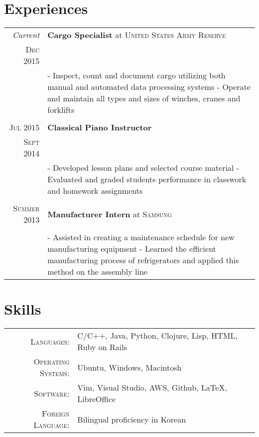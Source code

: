 \documentclass[a4paper,11pt]{article}
\begin{document}
			    \section{Experiences}
			    \begin{tabular}{r|p{11cm}}
			     \emph{Current} & \textbf{Cargo Specialist} at \textsc{United States Army Reserve} \\\textsc{Dec 2015}& \fontsize{10}{12}\selectfont{Arden Hills, MN}\\&\footnotesize{- Inspect, count and document cargo utilizing both manual and automated data processing systems \newline - Operate and maintain all types and sizes of winches, cranes and forklifts
			      }\\\multicolumn{2}{c}{} \\
			       \textsc{Jul 2015} & \textbf{Classical Piano Instructor} \\\textsc{Sept 2014} &\fontsize{10}{12}\selectfont{Oshkosh, WI} \\&\footnotesize{- Developed lesson plans and selected course material \newline- Evaluated and graded students performance in classwork and homework assignments} \\\multicolumn{2}{c}{} \\
			       \textsc{Summer 2013} & \textbf{Manufacturer Intern} at \textsc{Samsung}\\\textsc{} & \fontsize{10}{12}\selectfont{Gwangju, South Korea} \\&\footnotesize{- Assisted in creating a maintenance schedule for new manufacturing equipment \newline- Learned the efficient manufacturing process of refrigerators and applied this method on the assembly line}
			       \end{tabular}



			       \section{Skills}
			       \begin{tabular}{rl}
			        \textsc{Languages:}&C/C++, Java, Python, Clojure, Lisp, HTML, Ruby on Rails\\
				\textsc{Operating Systems:}& Ubuntu, Windows, Macintosh 
				\\
				\textsc{Software:}&Vim, Visual Studio, AWS, Github, {\fb \LaTeX}\setmainfont[SmallCapsFont=Fontin-SmallCaps.otf]{Fontin.otf}, LibreOffice 
				\\
				\textsc{Foreign Language:}&Bilingual proficiency in Korean\\
				\end{tabular}
\end{document}
